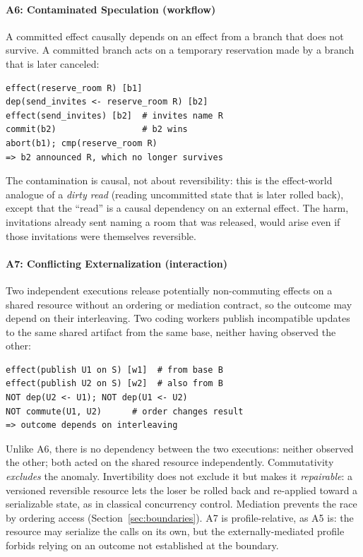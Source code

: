 \documentclass[runningheads]{comsis3}
\begin{document}
\paragraph{A6: Contaminated Speculation (workflow)}
A committed effect causally depends on an effect from a branch that
does not survive. A committed branch acts on a temporary reservation made
by a branch that is later canceled:
\par\medskip\noindent\begin{minipage}{\linewidth}
\begingroup\small\begin{verbatim}
effect(reserve_room R) [b1]
dep(send_invites <- reserve_room R) [b2]
effect(send_invites) [b2]  # invites name R
commit(b2)                 # b2 wins
abort(b1); cmp(reserve_room R)
=> b2 announced R, which no longer survives
\end{verbatim}\endgroup
\end{minipage}\par\medskip\noindent
The contamination is causal, not about reversibility: this is the
effect-world analogue of a \emph{dirty read} (reading uncommitted state that is later rolled back), except that the ``read'' is a causal dependency on
an external effect. The harm, invitations already sent naming a room that
was released, would arise even if those invitations were themselves
reversible.

\paragraph{A7: Conflicting Externalization (interaction)}
Two independent executions release potentially non-commuting effects
on a shared resource without an ordering or mediation contract, so the
outcome may depend on their interleaving. Two coding workers publish
incompatible updates to the same shared artifact from the same base,
neither having observed the other:
\par\medskip\noindent\begin{minipage}{\linewidth}
\begingroup\small\begin{verbatim}
effect(publish U1 on S) [w1]  # from base B
effect(publish U2 on S) [w2]  # also from B
NOT dep(U2 <- U1); NOT dep(U1 <- U2)
NOT commute(U1, U2)      # order changes result
=> outcome depends on interleaving
\end{verbatim}\endgroup
\end{minipage}\par\medskip\noindent
Unlike A6, there is no dependency between the two executions: neither
observed the other; both acted on the shared resource independently.
Commutativity \emph{excludes} the anomaly. Invertibility does not exclude
it but makes it \emph{repairable}: a versioned reversible resource lets
the loser be rolled back and re-applied toward a serializable state, as in
classical concurrency control. Mediation prevents the race by ordering
access (Section~\ref{sec:boundaries}). A7 is profile-relative, as A5 is:
the resource may serialize the calls on its own, but the externally-mediated
profile forbids relying on an outcome not established at the boundary.
\end{document}
